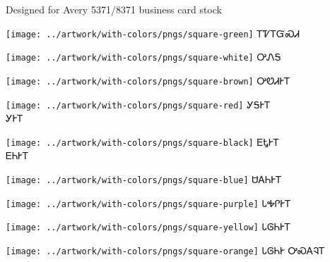\documentclass[avery5371]{flashcards}%
\begin{document}
Designed for Avery 5371/8371 business card stock

\begin{flashcard}{
\texttt{[image: ../artwork/with-colors/pngs/square-green]}
}\Huge ᎢᏤᎢᏳᏍᏗ
\end{flashcard}

\begin{flashcard}{
\texttt{[image: ../artwork/with-colors/pngs/square-white]}
}\Huge ᎤᏁᎦ
\end{flashcard}

\begin{flashcard}{
\texttt{[image: ../artwork/with-colors/pngs/square-brown]}
}\Huge ᎤᏬᏗᎨᎢ
\end{flashcard}

\begin{flashcard}{
\texttt{[image: ../artwork/with-colors/pngs/square-red]}
}\Huge ᎩᎦᎨᎢ\\ᎩᎨᎢ
\end{flashcard}

\begin{flashcard}{
\texttt{[image: ../artwork/with-colors/pngs/square-black]}
}\Huge ᎬᎿᎨᎢ\\ᎬᏂᎨᎢ
\end{flashcard}

\begin{flashcard}{
\texttt{[image: ../artwork/with-colors/pngs/square-blue]}
}\Huge ᏌᎪᏂᎨᎢ
\end{flashcard}

\begin{flashcard}{
\texttt{[image: ../artwork/with-colors/pngs/square-purple]}
}\Huge ᏓᎭᎵᎨᎢ
\end{flashcard}

\begin{flashcard}{
\texttt{[image: ../artwork/with-colors/pngs/square-yellow]}
}\Huge ᏓᎶᏂᎨᎢ
\end{flashcard}

\begin{flashcard}{
\texttt{[image: ../artwork/with-colors/pngs/square-orange]}
}\Huge ᏓᎶᏂᎨ ᎤᏍᎪᎸᎢ
\end{flashcard}
\end{document}
